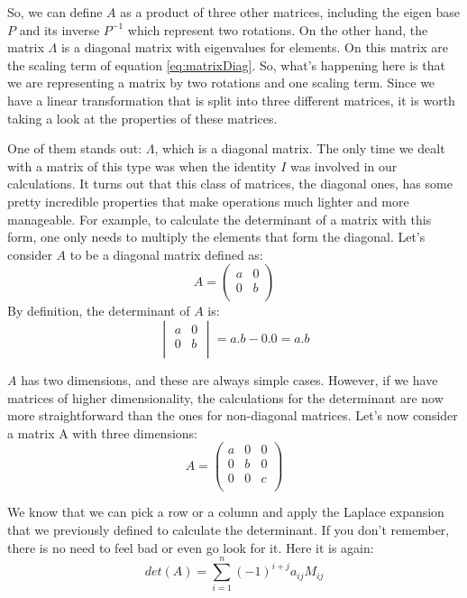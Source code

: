 \documentclass[a4,12pt,twosided,openany]{memoir}
\begin{document}
So, we can define $A$ as a product of three other matrices, including the eigen base $P$ and its inverse $P^{−1}$ which represent two rotations. On the other hand, the matrix  $\Lambda$ is a diagonal matrix with eigenvalues for elements. On this matrix are the scaling term of equation \ref{eq:matrixDiag}. So, what’s happening here is that we are representing a matrix by two rotations and one scaling term. Since we have a linear transformation that is split into three different matrices, it is worth taking a look at the properties of these matrices. 
\par 
\indent
One of them stands out: $\Lambda$, which is a diagonal matrix. The only time we dealt with a matrix of this type was when the identity $I$ was involved in our calculations. It turns out that this class of matrices, the diagonal ones, has some pretty incredible properties that make operations much lighter and more manageable. For example, to calculate the determinant of a matrix with this form, one only needs to multiply the elements that form the diagonal. Let’s consider $A$ to be a diagonal matrix defined as:
\[A = \begin{pmatrix}
a & 0 \\
0 & b \\
\end{pmatrix}
\]
By definition, the determinant of $A$ is:
\[
\begin{vmatrix}
a & 0 \\
0 & b \\
\end{vmatrix} = a.b- 0.0 = a.b
\]
\par 
\indent
$A$ has two dimensions, and these are always simple cases. However, if we have matrices of higher dimensionality, the calculations for the determinant are now more straightforward than the ones for non-diagonal matrices. Let’s now consider a matrix A with three dimensions:
\[
A = \begin{pmatrix}
a & 0 & 0\\
0 & b & 0\\
0 & 0 & c\\
\end{pmatrix}
\]
\par 
\indent
We know that we can pick a row or a column and apply the Laplace expansion that we previously defined to calculate the determinant. If you don’t remember, there is no need to feel bad or even go look for it. Here it is again:
\[det(A) = \sum_{i=1}^n(-1)^{i+j}a_{ij}M_{ij}\]
\par 
\indent
\end{document}
